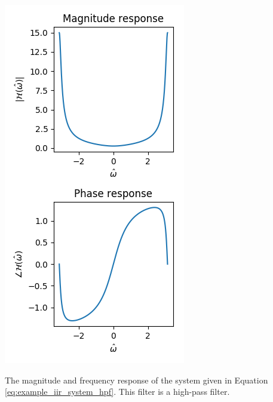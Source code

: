 \begin{marginfigure}
    \includegraphics[width=\textwidth]{code/026_iir/z_mag_angle_iir2.png}
    \caption{The magnitude and frequency response of the system given in
        Equation \ref{eq:example_iir_system_hpf}. This filter is a high-pass filter.}
    \label{fig:pz_diag2}
\end{marginfigure}


